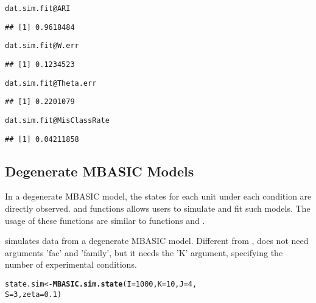\documentclass[a4paper,10pt]{article}\usepackage[]{graphicx}\usepackage[]{color}
\makeatletter
\newcommand{\hlnum}[1]{\textcolor[rgb]{0.686,0.059,0.569}{#1}}%
\newcommand{\hlopt}[1]{\textcolor[rgb]{0,0,0}{#1}}%
\newcommand{\hlstd}[1]{\textcolor[rgb]{0.345,0.345,0.345}{#1}}%
\newcommand{\hlkwb}[1]{\textcolor[rgb]{0.69,0.353,0.396}{#1}}%
\newcommand{\hlkwc}[1]{\textcolor[rgb]{0.333,0.667,0.333}{#1}}%
\newcommand{\hlkwd}[1]{\textcolor[rgb]{0.737,0.353,0.396}{\textbf{#1}}}%
\newenvironment{kframe}{%
 \def\at@end@of@kframe{}%
 \ifinner\ifhmode%
  \def\at@end@of@kframe{\end{minipage}}%
  \begin{minipage}{\columnwidth}%
 \fi\fi%
 \def\FrameCommand##1{\hskip\@totalleftmargin \hskip-\fboxsep
 \colorbox{shadecolor}{##1}\hskip-\fboxsep
     \hskip-\linewidth \hskip-\@totalleftmargin \hskip\columnwidth}%
 \MakeFramed {\advance\hsize-\width
   \@totalleftmargin\z@ \linewidth\hsize
   \@setminipage}}%
 {\par\unskip\endMakeFramed%
 \at@end@of@kframe}
\newenvironment{knitrout}{}{} %
\makeatother
\begin{document}
\begin{knitrout}
\color{fgcolor}\begin{kframe}
\begin{alltt}
\hlstd{dat.sim.fit}\hlopt{@}\hlkwc{ARI}
\end{alltt}
\begin{verbatim}
## [1] 0.9618484
\end{verbatim}
\begin{alltt}
\hlstd{dat.sim.fit}\hlopt{@}\hlkwc{W.err}
\end{alltt}
\begin{verbatim}
## [1] 0.1234523
\end{verbatim}
\begin{alltt}
\hlstd{dat.sim.fit}\hlopt{@}\hlkwc{Theta.err}
\end{alltt}
\begin{verbatim}
## [1] 0.2201079
\end{verbatim}
\begin{alltt}
\hlstd{dat.sim.fit}\hlopt{@}\hlkwc{MisClassRate}
\end{alltt}
\begin{verbatim}
## [1] 0.04211858
\end{verbatim}
\end{kframe}
\end{knitrout}

\subsection{Degenerate MBASIC Models}

In a degenerate MBASIC model, the states for each unit under each condition are directly observed.  and  functions allows users to simulate and fit such models. The usage of these functions are similar to functions  and .

 simulates data from a degenerate MBASIC model. Different from ,  does not need arguments 'fac' and 'family', but it needs the 'K' argument, specifying the number of experimental conditions.

\begin{knitrout}
\color{fgcolor}\begin{kframe}
\begin{alltt}
\hlstd{state.sim} \hlkwb{<-} \hlkwd{MBASIC.sim.state}\hlstd{(}\hlkwc{I} \hlstd{=} \hlnum{1000}\hlstd{,} \hlkwc{K} \hlstd{=} \hlnum{10}\hlstd{,} \hlkwc{J} \hlstd{=} \hlnum{4}\hlstd{,}
    \hlkwc{S} \hlstd{=} \hlnum{3}\hlstd{,} \hlkwc{zeta} \hlstd{=} \hlnum{0.1}\hlstd{)}
\end{alltt}
\end{kframe}
\end{knitrout}
\end{document}
